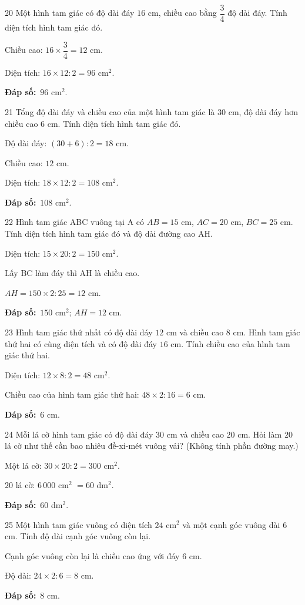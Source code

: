 \documentclass[11pt]{article}
\newif\ifsol \solfalse
\providecommand{\AnsWord}{Đáp số}
\newcommand{\dapso}[1]{\par\textbf{\AnsWord:}\ #1}
\newcommand{\probsol}[1]{%
  \begin{lrbox}{\solmeasure}\begin{minipage}{\dimexpr\linewidth-24pt\relax}#1\end{minipage}\end{lrbox}%
  \ifsol
    \begin{solbox}#1\end{solbox}%
  \else
    \setlength{\solht}{\dimexpr\ht\solmeasure+\dp\solmeasure+0.85cm\relax}%
    \ifdim\solht<1.35cm\setlength{\solht}{1.35cm}\fi
    \begin{tcolorbox}[colback=white,colframe=Line,boxrule=0.8pt,arc=5pt,
      left=8pt,right=8pt,top=4pt,bottom=4pt,height=\solht]{\footnotesize\color{Slate}\itshape\WorkWord}\end{tcolorbox}%
  \fi}
\newcommand{\gap}{\vspace{0.3cm}}
\def\WorkWord{Bài làm:}
\def\AnsWord{Đáp số}
\begin{document}
\gap
\begin{probbox}{20}{\relax}
Một hình tam giác có độ dài đáy $16$ cm, chiều cao bằng $\dfrac34$ độ dài đáy. Tính diện tích hình tam giác đó.
\end{probbox}
\probsol{
Chiều cao: $16\times\dfrac34=12$ cm.\par Diện tích: $16\times12:2=96$ cm$^2$.
\dapso{$96$ cm$^2$.}}
\gap
\begin{probbox}{21}{\relax}
Tổng độ dài đáy và chiều cao của một hình tam giác là $30$ cm, độ dài đáy hơn chiều cao $6$ cm. Tính diện tích hình tam giác đó.
\end{probbox}
\probsol{
Độ dài đáy: $(30+6):2=18$ cm.\par Chiều cao: $12$ cm.\par Diện tích: $18\times12:2=108$ cm$^2$.
\dapso{$108$ cm$^2$.}}
\gap
\begin{probbox}{22}{\relax}
Hình tam giác ABC vuông tại A có $AB=15$ cm, $AC=20$ cm, $BC=25$ cm. Tính diện tích hình tam giác đó và độ dài đường cao AH.
\end{probbox}
\probsol{
Diện tích: $15\times20:2=150$ cm$^2$.\par Lấy BC làm đáy thì AH là chiều cao.\par $AH=150\times2:25=12$ cm.
\dapso{$150$ cm$^2$; $AH=12$ cm.}}
\gap
\begin{probbox}{23}{\relax}
Hình tam giác thứ nhất có độ dài đáy $12$ cm và chiều cao $8$ cm. Hình tam giác thứ hai có cùng diện tích và có độ dài đáy $16$ cm. Tính chiều cao của hình tam giác thứ hai.
\end{probbox}
\probsol{
Diện tích: $12\times8:2=48$ cm$^2$.\par Chiều cao của hình tam giác thứ hai: $48\times2:16=6$ cm.
\dapso{$6$ cm.}}
\gap
\begin{probbox}{24}{\relax}
Mỗi lá cờ hình tam giác có độ dài đáy $30$ cm và chiều cao $20$ cm. Hỏi làm $20$ lá cờ như thế cần bao nhiêu đề-xi-mét vuông vải? (Không tính phần đường may.)
\end{probbox}
\probsol{
Một lá cờ: $30\times20:2=300$ cm$^2$.\par $20$ lá cờ: $6\,000$ cm$^2$ $=60$ dm$^2$.
\dapso{$60$ dm$^2$.}}
\gap
\begin{probbox}{25}{\relax}
Một hình tam giác vuông có diện tích $24$ cm$^2$ và một cạnh góc vuông dài $6$ cm. Tính độ dài cạnh góc vuông còn lại.
\end{probbox}
\probsol{
Cạnh góc vuông còn lại là chiều cao ứng với đáy $6$ cm.\par Độ dài: $24\times2:6=8$ cm.
\dapso{$8$ cm.}}
\end{document}
